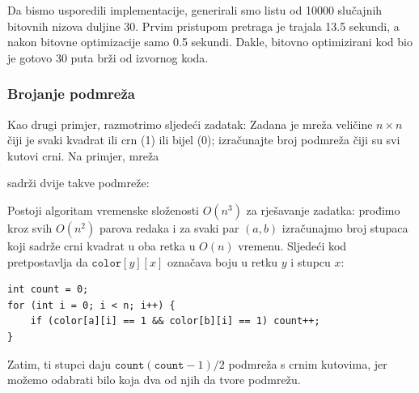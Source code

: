 Da bismo usporedili implementacije, generirali smo
listu od 10000 slučajnih bitovnih nizova duljine 30.
Prvim pristupom pretraga je trajala
13.5 sekundi, a nakon bitovne optimizacije
samo 0.5 sekundi.
Dakle, bitovno optimizirani kod bio je gotovo
30 puta brži od izvornog koda.

\subsubsection{Brojanje podmreža}

Kao drugi primjer, razmotrimo
sljedeći zadatak:
Zadana je mreža veličine $n \times n$ čiji je
svaki kvadrat ili crn (1) ili bijel (0);
izračunajte broj podmreža
čiji su svi kutovi crni.
Na primjer, mreža
\begin{center}
\end{center}
sadrži dvije takve podmreže:
\begin{center}
\end{center}

Postoji algoritam vremenske složenosti $O(n^3)$ za rješavanje zadatka:
prođimo kroz svih $O(n^2)$ parova redaka i za svaki par
$(a,b)$ izračunajmo broj stupaca koji sadrže crni
kvadrat u oba retka u $O(n)$ vremenu.
Sljedeći kod pretpostavlja da $\texttt{color}[y][x]$
označava boju u retku $y$ i stupcu $x$:
\begin{lstlisting}
int count = 0;
for (int i = 0; i < n; i++) {
    if (color[a][i] == 1 && color[b][i] == 1) count++;
}
\end{lstlisting}
Zatim, ti stupci
daju $\texttt{count}(\texttt{count}-1)/2$ podmreža s crnim kutovima,
jer možemo odabrati bilo koja dva od njih da tvore podmrežu.


